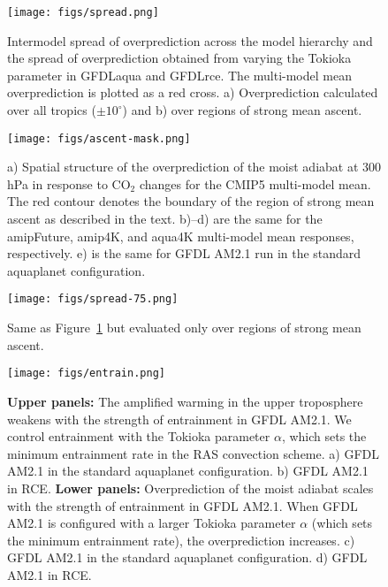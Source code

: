 \documentclass{ametsocV5}
\begin{document}
\begin{figure}
\centering
\texttt{[image: figs/spread.png]}
\caption{Intermodel spread of overprediction across the model hierarchy and the spread of overprediction obtained from varying the Tokioka parameter in GFDLaqua and GFDLrce. The multi-model mean overprediction is plotted as a red cross. a) Overprediction calculated over all tropics ($\pm10^\circ$) and b) over regions of strong mean ascent.}
\label{fig:spread}
\end{figure}

\begin{figure}
\centering
\texttt{[image: figs/ascent-mask.png]}
\caption{a) Spatial structure of the overprediction of the moist adiabat at 300 hPa in response to CO$_2$ changes for the CMIP5 multi-model mean. The red contour denotes the boundary of the region of strong mean ascent as described in the text. b)--d) are the same for the amipFuture, amip4K, and aqua4K multi-model mean responses, respectively. e) is the same for GFDL AM2.1 run in the standard aquaplanet configuration.}
\label{fig:ascent-mask}
\end{figure}

\begin{figure}
\centering
\texttt{[image: figs/spread-75.png]}
\caption{Same as Figure~\ref{fig:spread} but evaluated only over regions of strong mean ascent.}
\label{fig:spread-75}
\end{figure}

\begin{figure}
\centering
\texttt{[image: figs/entrain.png]}
\caption{\textbf{Upper panels:} The amplified warming in the upper troposphere weakens with the strength of entrainment in GFDL AM2.1. We control entrainment with the Tokioka parameter $\alpha$, which sets the minimum entrainment rate in the RAS convection scheme. a) GFDL AM2.1 in the standard aquaplanet configuration. b) GFDL AM2.1 in RCE. \textbf{Lower panels:} Overprediction of the moist adiabat scales with the strength of entrainment in GFDL AM2.1. When GFDL AM2.1 is configured with a larger Tokioka parameter $\alpha$ (which sets the minimum entrainment rate), the overprediction increases. c) GFDL AM2.1 in the standard aquaplanet configuration. d) GFDL AM2.1 in RCE.}
\label{fig:entrain}
\end{figure}
\end{document}
